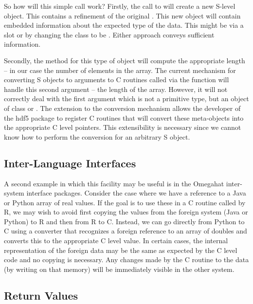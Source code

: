 \documentclass{article}
\begin{document}
So how will this simple call work?  Firstly, the call to
 will create a new S-level object.  This
contains a refinement of the original . This new
object will contain embedded information about the expected type of
the data. This might be via a  slot or by changing the
class to be . Either approach conveys
sufficient information.

Secondly, the  method for this type of object will
compute the appropriate length -- in our case the number of elements
in the array.  The current mechanism for converting S objects to
arguments to C routines called via the  function will
handle this second argument -- the length of the array. However, it
will not correctly deal with the first argument which is not a
primitive type, but an object of class  or
. The extension  to the
conversion mechanism allows the developer of the hdf5 package to
register C routines that will convert these meta-objects into the
appropriate C level pointers. This extensibility is necessary since we
cannot know how to perform the conversion for an arbitrary S object.


\subsection{Inter-Language Interfaces}

A second example in which this facility may be useful is in the
Omegahat inter-system interface packages. Consider the case where we
have a reference to a Java or Python array of real values.  If the
goal is to use these in a C routine called by R, we may wish to avoid
first copying the values from the foreign system (Java or Python) to R
and then from R to C.  Instead, we can go directly from Python to C
using a converter that recognizes a foreign reference to an array of
doubles and converts this to the appropriate C level value.  In
certain cases, the internal representation of the foreign data may be
the same as expected by the C level code and no copying is
necessary. Any changes made by the C routine to the data (by writing
on that memory) will be immediately visible in the other system.

\subsection{Return Values}
\end{document}
